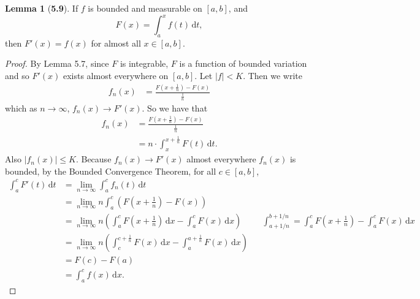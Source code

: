 \documentclass[12pt]{article}
\newcommand{\dif}{\, \mathrm{d}}
\theoremstyle{definition}
\newtheorem*{lemma}{Lemma}
\begin{document}
\begin{lemma}[\textbf{5.9}]

    If \( f \) is bounded and measurable on \( [a,b] \), and 
        \[
            F(x) = \int_{a}^{x} f(t) \dif t,
        \]  
    then \( F'(x) = f(x) \) for almost all \( x \in [a,b ] \).

    \begin{proof}
        By Lemma 5.7, since \( F \) is integrable, \( F \) is a function of bounded variation and so \( F'(x) \) exists almost everywhere on \( [a,b] \). Let \( |f| < K \). Then we write
            \begin{align*}
                f_n(x) &= \frac{F\left( x + \frac{1}{n}\right) - F(x)}{\frac{1}{n}} 
            \end{align*}
        which as \( n \to \infty \), \( f_n(x) \to F'(x) \). So we have that 
            \begin{align*}
                f_n(x) &= \frac{F\left( x + \frac{1}{n}\right) - F(x)}{\frac{1}{n}} \\
                &= n \cdot \int_{x}^{x+ \frac{1}{n}} F(t) \dif t.
            \end{align*}
        Also \( |f_n(x)| \leq K \). Because \( f_n(x) \to F'(x) \) almost everywhere \( f_n(x) \) is bounded, by the Bounded Convergence Theorem, for all \( c \in [a,b] \), 
            \begin{align*}
                \int_{a}^{c} F'(t) \dif t &= \lim_{n \to \infty} \int_{a}^{c} f_n(t) \dif t \\
                &= \lim_{n \to \infty} n \int_{a}^{c} \left( F \left( x + \frac{1}{n}\right) - F(x) \right) \\
                &= \lim_{n \to \infty} n \left( \int_{a}^{c} F \left( x + \frac{1}{n} \right) \dif x - \int_{a}^{c} F(x) \dif x \right) && \int_{a + 1/n}^{b + 1/n} = \int_{a}^{c} F \left( x + \frac{1}{n} \right) - \int_a^c F(x) \dif x \\
                &= \lim_{n \to \infty } n  \left(\int_{c}^{c + \frac{1}{n}} F(x) \dif x  - \int_{a}^{a + \frac{1}{n}} F(x) \dif x \right) \\
                &= F(c) - F(a) \\
                &= \int_{a}^{c} f(x) \dif x. 
            \end{align*}
    \end{proof}
    
\end{lemma}
\end{document}
